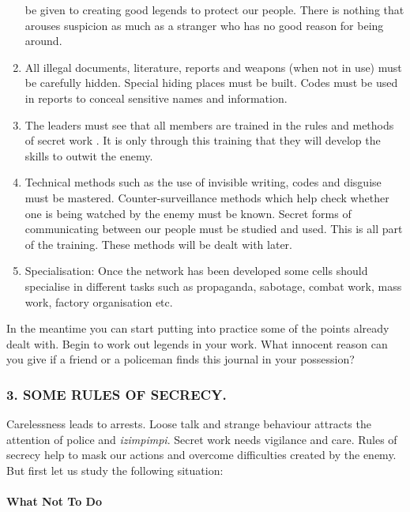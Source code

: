 \begin{enumerate}
  be given to creating good legends to protect our people. There is
  nothing that arouses suspicion as much as a stranger who has no good
  reason for being around.
\item
  All illegal documents, literature, reports and weapons (when not in
  use) must be carefully hidden. Special hiding places must be built.
  Codes must be used in reports to conceal sensitive names and
  information.
\item
  The leaders must see that all members are trained in the rules and
  methods of secret work . It is only through this training that they
  will develop the skills to outwit the enemy.
\item
  Technical methods such as the use of invisible writing, codes and
  disguise must be mastered. Counter-surveillance methods which help
  check whether one is being watched by the enemy must be known. Secret
  forms of communicating between our people must be studied and used.
  This is all part of the training. These methods will be dealt with
  later.
\item
  Specialisation: Once the network has been developed some cells should
  specialise in different tasks such as propaganda, sabotage, combat
  work, mass work, factory organisation etc.
\end{enumerate}

In the meantime you can start putting into practice some of the points
already dealt with. Begin to work out legends in your work. What
innocent reason can you give if a friend or a policeman finds this
journal in your possession?

\subsubsection{3. SOME RULES OF SECRECY.}

Carelessness leads to arrests. Loose talk and strange behaviour attracts
the attention of police and \emph{izimpimpi}. Secret work needs
vigilance and care. Rules of secrecy help to mask our actions and
overcome difficulties created by the enemy. But first let us study the
following situation:

\paragraph{What Not To Do}

